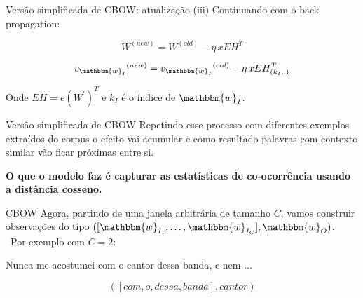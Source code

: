 \documentclass{beamer}
\newcommand{\wo}{\mathbbm{w}}
\begin{document}
\begin{frame}[fragile]{Versão simplificada de CBOW: atualização  (iii)}
Continuando com o back propagation:

\vspace{0.1cm}

\begin{equation}\label{eq:11}
W^{(new)} = W^{(old)} - \eta \, x EH^{T}
\end{equation}

\vspace{0.1cm}

\begin{equation}\label{eq:12}
{v_{\wo_{I}}}^{(new)} = {v_{\wo_{I}}}^{(old)} - \eta \, x EH^{T}_{(k_{I},.)} 
\end{equation}

\vspace{0.2cm}

Onde $EH = e {(W^{\prime})}^{T}$ e $k_{I}$ é o índice de $\wo_{I}$.
\end{frame}

\begin{frame}[fragile]{Versão simplificada de CBOW}
Repetindo esse processo com diferentes exemplos extraídos do corpus o efeito vai acumular e como resultado {\color{blue!89} palavras com contexto similar vão ficar próximas entre si}.\\

\vspace{0.3cm}
\begin{center}
\textbf{O que o modelo faz é capturar as estatísticas de co-ocorrência usando a distância cosseno.}
\end{center}

\end{frame}


\begin{frame}[fragile]{CBOW}
Agora, partindo de uma janela arbitrária de tamanho $C$, vamos construir observações do tipo $([\wo_{I_{1}},\dots, \wo_{I_{C}}], \wo_{O})$.\\\
Por exemplo com $C=2$:
\vspace{0.2cm}

\begin{center}
Nunca me acostumei {\color{red!89} com o} {\color{blue!89}cantor} {\color{red!89}dessa banda}, e nem ...
\end{center}

\vspace{0.2cm}
\[
([com, o, dessa, banda], cantor)
\]
\end{frame}
\end{document}

